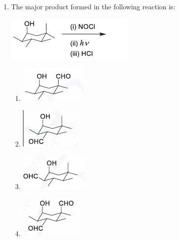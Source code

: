 \documentclass[journal,12pt,onecolumn]{IEEEtran}
\begin{document}
\begin{enumerate}
    \item The major product formed in the following reaction is: 
    \begin{center}
    \includegraphics[width=0.6\columnwidth]{figs/q15.png}
    \end{center}
    \begin{multicols}{2}
    \begin{enumerate}
        \item \includegraphics[width=0.4\columnwidth]{figs/q15a.png}
        \item \includegraphics[width=0.4\columnwidth]{figs/q15b.png}
        \item \includegraphics[width=0.4\columnwidth]{figs/q15c.png}
        \item \includegraphics[width=0.4\columnwidth]{figs/q15d.png}
    \end{enumerate}
    \end{multicols}
    \hfill{}


\end{enumerate}
\end{document}
